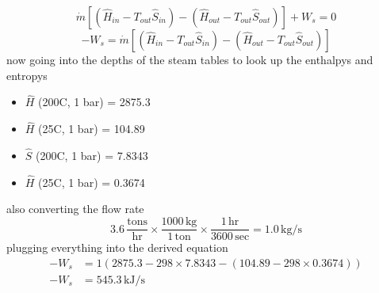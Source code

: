 \documentclass{article}
\begin{document}
\[ \dot{m}\left[\left(\hat{H}_{in} - T_{out}\hat{S}_{in}\right) - \left(\hat{H}_{out} - T_{out}\hat{S}_{out}\right)\right] + W_s = 0 \]
\[ -W_s = \dot{m}\left[\left(\hat{H}_{in} - T_{out}\hat{S}_{in}\right) - \left(\hat{H}_{out} - T_{out}\hat{S}_{out}\right)\right]  \]
now going into the depths of the steam tables to look up the enthalpys and entropys
\begin{itemize}
    \item $\hat{H}$ (200C, 1 bar) = 2875.3
    \item $\hat{H}$ (25C, 1 bar) = 104.89
    \item $\hat{S}$ (200C, 1 bar) = 7.8343
    \item $\hat{H}$ (25C, 1 bar) = 0.3674
\end{itemize}
also converting the flow rate
\[ 3.6\,\frac{\text{tons}}{\text{hr}} \times \frac{1000\,\text{kg}}{1\,\text{ton}} \times \frac{1\,\text{hr}}{3600\,\text{sec}} = 1.0\,\text{kg/s} \]
plugging everything into the derived equation
\begin{align*}
    -W_s &= 1 \left(2875.3 - 298 \times 7.8343 - \left(104.89 - 298 \times 0.3674\right)\right) \\
    -W_s &= 545.3\,\text{kJ/s}
\end{align*}
\end{document}
